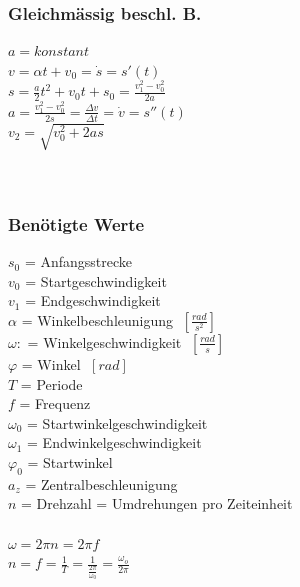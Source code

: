 \begin{multicols}{3}
	\subsubsection{Gleichmässig beschl. B.}
	$a = konstant$ \\
	$v = \alpha t + v_{0} = \dot s = s'(t)$ \\
	$s = \frac{a}{2}t^2 + v_{0}t + s_{0} = \frac{v_{1}^2 - v_{0}^2}{2a}$ \\
	$a = \frac{v_{1}^2 - v_{0}^2}{2s} = \frac{\Delta v}{\Delta t} = \dot v = s''(t)$ \\
	$v_{2} = \sqrt{v_{0}^2 + 2as}$ \\
	\\
	\\
\columnbreak
	\subsubsection{Benötigte Werte}
	$s_{0}$ = Anfangsstrecke \\
	$v_{0}$ = Startgeschwindigkeit \\
	$v_{1}$ = Endgeschwindigkeit \\
	$\alpha$ = Winkelbeschleunigung $\; [\frac{rad}{s^2}]$ \\
	$\omega:$ = Winkelgeschwindigkeit $\; [\frac{rad}{s}]$ \\
	$\varphi$ = Winkel $\; [rad]$ \\
	$T$ = Periode \\
	$f$ = Frequenz \\
	$\omega_{0}$ = Startwinkelgeschwindigkeit  \\
	$\omega_{1}$ = Endwinkelgeschwindigkeit  \\
	$\varphi_{0}$ = Startwinkel  \\
	$a_{z}$ = Zentralbeschleunigung \\
	$n$ = Drehzahl = Umdrehungen pro Zeiteinheit\\
	\\
	$ \omega = 2 \pi n = 2 \pi f$ \\
	$ n = f = \frac{1}{T} = \frac{1}{\frac{2 \pi}{\omega_0}} = \frac{\omega_o}{2\pi}$
\end{multicols}
	
